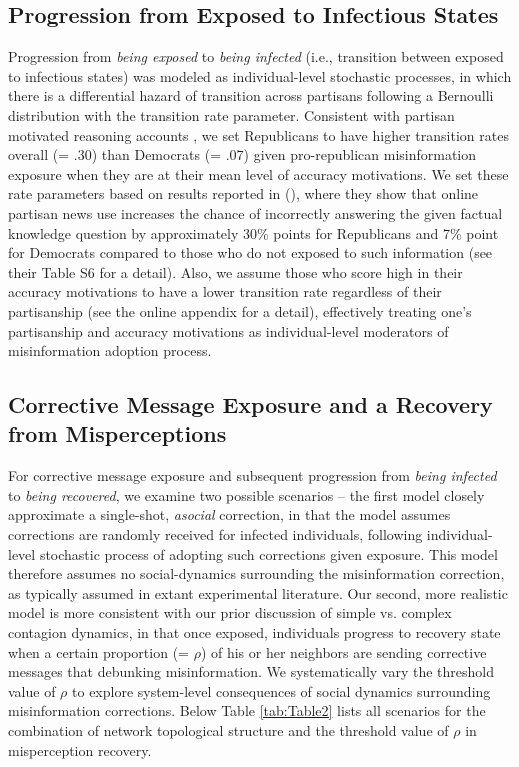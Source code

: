 \documentclass[man, 12pt, a4paper, nolmodern, noextraspace]{apa6}
\begin{document}
\subsection{Progression from Exposed to Infectious States}
    Progression from \emph{being exposed} to \emph{being infected} (i.e., transition between exposed to infectious states) was modeled as individual-level stochastic processes, in which there is a differential hazard of transition across partisans following a Bernoulli distribution with the transition rate parameter. Consistent with partisan motivated reasoning accounts \parencite{taber2006, nyhan2010corrections}, we set Republicans to have higher transition rates overall (= .30) than Democrats (= .07) given pro-republican misinformation exposure when they are at their mean level of accuracy motivations. We set these rate parameters based on results reported in \citeauthor{garrett2016driving} (\citeyear{garrett2016driving}), where they show that online partisan news use increases the chance of incorrectly answering the given factual knowledge question by approximately 30\% points for Republicans and 7\% point for Democrats compared to those who do not exposed to such information (see their Table S6 for a detail). Also, we assume those who score high in their accuracy motivations to have a lower transition rate regardless of their partisanship (see the online appendix for a detail), effectively treating one's partisanship and accuracy motivations as individual-level moderators of misinformation adoption process. 

\subsection{Corrective Message Exposure and a Recovery from Misperceptions}
	For corrective message exposure and subsequent progression from \emph{being infected} to \emph{being recovered}, we examine two possible scenarios -- the first model closely approximate a single-shot, \emph{asocial} correction, in that the model assumes  corrections are randomly received for infected individuals, following individual-level stochastic process of adopting such corrections given exposure. This model therefore assumes no social-dynamics surrounding the misinformation correction, as typically assumed in extant experimental literature. Our second, more realistic model is more consistent with our prior discussion of simple vs. complex contagion dynamics, in that once exposed, individuals progress to recovery state when a certain proportion (= $\rho$) of his or her neighbors are sending corrective messages that debunking misinformation. We systematically vary the threshold value of $\rho$ to explore system-level consequences of social dynamics surrounding misinformation corrections. Below Table \ref{tab:Table2} lists all scenarios for the combination of network topological structure and the threshold value of $\rho$ in misperception recovery. 
\end{document}
